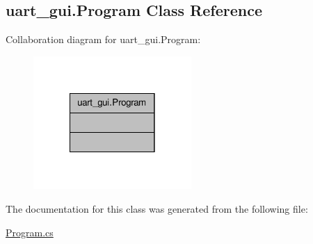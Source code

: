 \hypertarget{classuart__gui_1_1_program}{\subsection{uart\-\_\-gui.\-Program Class Reference}
\label{classuart__gui_1_1_program}
}


Collaboration diagram for uart\-\_\-gui.\-Program\-:\nopagebreak
\begin{figure}[H]
\begin{center}
\leavevmode
\includegraphics[width=170pt]{d3/dd1/classuart__gui_1_1_program__coll__graph}
\end{center}
\end{figure}


The documentation for this class was generated from the following file\-:\begin{DoxyCompactItemize}
\item 
\hyperlink{_program_8cs}{Program.\-cs}\end{DoxyCompactItemize}
